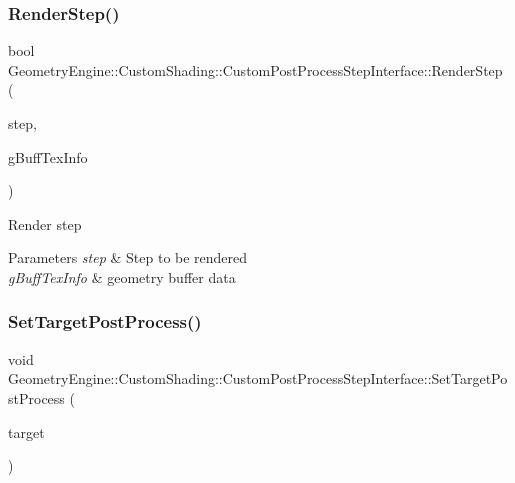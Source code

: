 \subsubsection{\texorpdfstring{RenderStep()}{RenderStep()}}
{\footnotesize\ttfamily bool Geometry\+Engine\+::\+Custom\+Shading\+::\+Custom\+Post\+Process\+Step\+Interface\+::\+Render\+Step (\begin{DoxyParamCaption}\item[{const \mbox{\hyperlink{namespace_geometry_engine_1_1_custom_shading_a09e44ca81de5fe08c6d50271d680c4b1}{Custom\+Post\+Process\+Steps}} \&}]{step,  }\item[{const \mbox{\hyperlink{class_geometry_engine_1_1_g_buffer_texture_info}{G\+Buffer\+Texture\+Info}} \&}]{g\+Buff\+Tex\+Info }\end{DoxyParamCaption})\hspace{0.3cm}{\ttfamily [virtual]}}

Render step 
\begin{DoxyParams}{Parameters}
{\em step} & Step to be rendered \\
\hline
{\em g\+Buff\+Tex\+Info} & geometry buffer data \\
\hline
\end{DoxyParams}
\mbox{\label{class_geometry_engine_1_1_custom_shading_1_1_custom_post_process_step_interface_a122afe43200a8b32100b8dea42010418}} 
\subsubsection{\texorpdfstring{SetTargetPostProcess()}{SetTargetPostProcess()}}
{\footnotesize\ttfamily void Geometry\+Engine\+::\+Custom\+Shading\+::\+Custom\+Post\+Process\+Step\+Interface\+::\+Set\+Target\+Post\+Process (\begin{DoxyParamCaption}\item[{\mbox{\hyperlink{class_geometry_engine_1_1_geometry_post_process_1_1_post_process}{Geometry\+Post\+Process\+::\+Post\+Process}} $\ast$}]{target }\end{DoxyParamCaption})}

